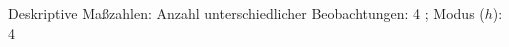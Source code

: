 				\label{tableValues:bfvt02}
				\vspace*{-\baselineskip}
                    \begin{noten}
                	    \note{} Deskriptive Maßzahlen:
                	    Anzahl unterschiedlicher Beobachtungen: 4%
                	    ; 
                	      Modus ($h$): 4
                     \end{noten}

